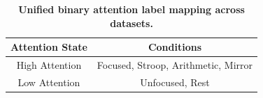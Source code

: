 \begin{table}[!ht]
\centering
\caption{\textbf{Unified binary attention label mapping across datasets.}}
\label{tab:attention_label_mapping}
\begin{tabular}{|c|c|}
\hline
\textbf{Attention State} & \textbf{Conditions} \\
\hline
High Attention & Focused, Stroop, Arithmetic, Mirror \\
Low Attention  & Unfocused, Rest \\
\hline
\end{tabular}
\end{table}

